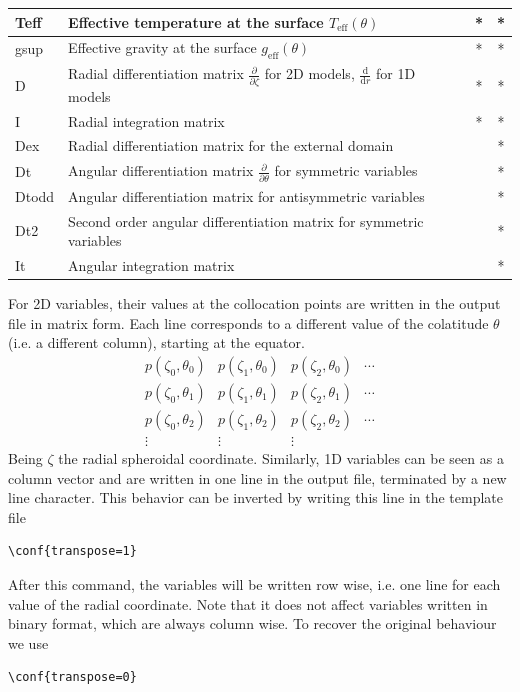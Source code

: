 \begin{longtable}{|l|p{8cm}|c|c|}
\hline
Teff&Effective temperature at the surface $T_\mathrm{eff}(\theta)$&*&*\\
\hline
gsup&Effective gravity at the surface $g_\mathrm{eff}(\theta)$&*&*\\
\hline
D&Radial differentiation matrix $\frac{\partial}{\partial\zeta}$ for 2D models,
$\frac{\mathrm{d}}{\mathrm{d}r}$ for 1D models&*&*\\
\hline
I&Radial integration matrix&*&*\\
\hline
Dex&Radial differentiation matrix for the external domain&&*\\
\hline
Dt&Angular differentiation matrix $\frac{\partial}{\partial\theta}$ for symmetric variables&&*\\
\hline
Dtodd&Angular differentiation matrix for antisymmetric variables&&*\\
\hline
Dt2&Second order angular differentiation matrix for symmetric variables&&*\\
\hline
It&Angular integration matrix&&*\\
\hline
\end{longtable}
For 2D variables, their values at the collocation points are written in the output file
in matrix form. Each line corresponds to a different value of the colatitude $\theta$
(i.e. a different column), starting at the equator.
$$\begin{array}{cccc}
p(\zeta_0,\theta_0)&p(\zeta_1,\theta_0)&p(\zeta_2,\theta_0)&\cdots\\
p(\zeta_0,\theta_1)&p(\zeta_1,\theta_1)&p(\zeta_2,\theta_1)&\cdots\\
p(\zeta_0,\theta_2)&p(\zeta_1,\theta_2)&p(\zeta_2,\theta_2)&\cdots\\
\vdots&\vdots&\vdots&
\end{array}$$
Being $\zeta$ the radial spheroidal coordinate.
Similarly, 1D variables can be seen as a column vector and are written in one line in the
output file, terminated by a new line character.
This behavior can be inverted by writing this line in the template file
\begin{verbatim}
\conf{transpose=1}
\end{verbatim}
After this command, the variables will be written row wise, i.e. one line for each value of
the radial coordinate. Note that it does not affect variables written in binary format,
which are always column wise. To recover the original behaviour we use
\begin{verbatim}
\conf{transpose=0}
\end{verbatim}

